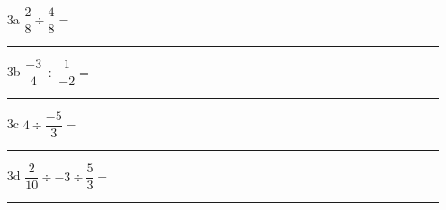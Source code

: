 \documentclass[12pt]{article}
\begin{document}
\begin{enumerate}
\item[3a] $ \dfrac{2}{8} \div \dfrac{4}{8} = $\\
  \rule{\linewidth}{0.5pt}
\item[3b] $ \dfrac{-3}{4} \div \dfrac{1}{-2} = $\\
  \rule{\linewidth}{0.5pt}
\item[3c] $ 4 \div \dfrac{-5}{3} = $\\
    \rule{\linewidth}{0.5pt}
\item[3d] $ \dfrac{2}{10} \div -3 \div \dfrac{5}{3} = $\\
  \rule{\linewidth}{0.5pt}
\end{enumerate}
\end{document}
